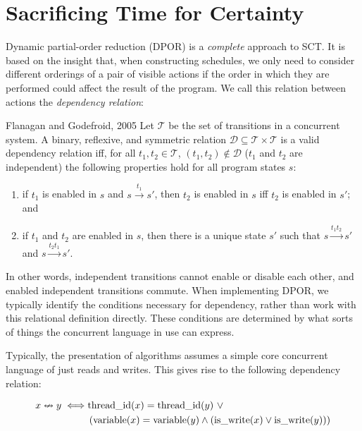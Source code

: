 \section{Sacrificing Time for Certainty}
\label{sec:sct-complete}

Dynamic partial-order reduction (DPOR)\cite{flanagan2005,godefroid1996} is a
\emph{complete} approach to SCT\@.  It is based on the insight that, when
constructing schedules, we only need to consider different orderings of a pair
of visible actions if the order in which they are performed could affect the
result of the program.  We call this relation between actions
the \emph{dependency relation}:

\begin{bquote}{Flanagan and Godefroid, 2005\nocite{flanagan2005}}
  Let $\mathcal T$ be the set of transitions in a concurrent system.  A binary,
  reflexive, and symmetric relation $\mathcal D \subseteq \mathcal
  T \times \mathcal T$ is a valid dependency relation iff, for all $t_{1},
  t_{2} \in \mathcal T$, $(t_{1}, t_{2}) \notin \mathcal D$ ($t_{1}$ and $t_{2}$
  are independent) the following properties hold for all program states $s$:

  \begin{enumerate}
  \item if $t_{1}$ is enabled in $s$ and $s \xrightarrow{t_{1}} s'$, then
    $t_{2}$ is enabled in $s$ iff $t_{2}$ is enabled in $s'$; and

  \item if $t_{1}$ and $t_{2}$ are enabled in $s$, then there is a unique state
    $s'$ such that $s \xrightarrow{t_{1}t_{2}} s'$ and
    $s \xrightarrow{t_{2}t_{1}} s'$.
  \end{enumerate}
\end{bquote}

In other words, independent transitions cannot enable or disable each other, and
enabled independent transitions commute.  When implementing DPOR, we typically
identify the conditions necessary for dependency, rather than work with this
relational definition directly.  These conditions are determined by what sorts
of things the concurrent language in use can express.

Typically, the presentation of algorithms assumes a simple core concurrent
language of just reads and writes.  This gives rise to the following dependency
relation:

\begin{align*}
  x \nleftrightarrow y \iff& \mathrm{thread\_id}(x) = \mathrm{thread\_id}(y)~\lor\\
    &\left(\mathrm{variable}(x) = \mathrm{variable}(y)
     \land \left(\mathrm{is\_write}(x) \lor \mathrm{is\_write}(y)\right)\right)
\end{align*}

